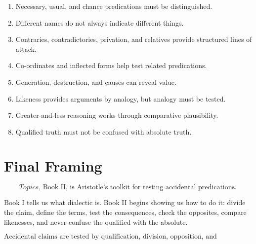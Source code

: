 \documentclass[12pt]{article}
\begin{document}
\begin{enumerate}[itemsep=0.5em]
    \item Necessary, usual, and chance predications must be distinguished.

    \item Different names do not always indicate different things.

    \item Contraries, contradictories, privation, and relatives provide
    structured lines of attack.

    \item Co-ordinates and inflected forms help test related predications.

    \item Generation, destruction, and causes can reveal value.

    \item Likeness provides arguments by analogy, but analogy must be tested.

    \item Greater-and-less reasoning works through comparative plausibility.

    \item Qualified truth must not be confused with absolute truth.
\end{enumerate}

\section*{Final Framing}

\[
\boxed{
\textit{Topics}, \text{ Book II, is Aristotle's toolkit for testing accidental predications.}
}
\]

Book I tells us what dialectic is. Book II begins showing us how to do it:
divide the claim, define the terms, test the consequences, check the opposites,
compare likenesses, and never confuse the qualified with the absolute.

\[
\boxed{
\text{Accidental claims are tested by qualification, division, opposition, and consequence.}
}
\]
\end{document}
